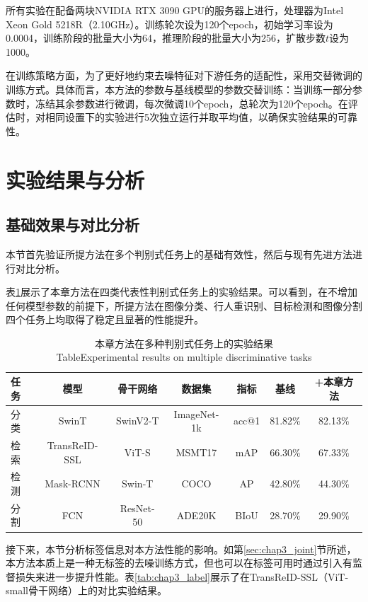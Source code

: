 所有实验在配备两块NVIDIA RTX 3090 GPU的服务器上进行，处理器为Intel Xeon Gold 5218R（2.10GHz）。训练轮次设为120个epoch，初始学习率设为0.0004，训练阶段的批量大小为64，推理阶段的批量大小为256，扩散步数$t$设为1000。

在训练策略方面，为了更好地约束去噪特征对下游任务的适配性，采用交替微调的训练方式。具体而言，本方法的参数与基线模型的参数交替训练：当训练一部分参数时，冻结其余参数进行微调，每次微调10个epoch，总轮次为120个epoch。在评估时，对相同设置下的实验进行5次独立运行并取平均值，以确保实验结果的可靠性。

\section{实验结果与分析}
\label{sec:chap3_exp_result}

\subsection{基础效果与对比分析}

本节首先验证所提方法在多个判别式任务上的基础有效性，然后与现有先进方法进行对比分析。

表\ref{tab:chap3_multi_task}展示了本章方法在四类代表性判别式任务上的实验结果。可以看到，在不增加任何模型参数的前提下，所提方法在图像分类、行人重识别、目标检测和图像分割四个任务上均取得了稳定且显著的性能提升。

\begin{table}[htbp]
\centering
\caption{本章方法在多种判别式任务上的实验结果\protect\\[-2pt]{\rm Table\;\thetable\quad Experimental results on multiple discriminative tasks}}\label{tab:chap3_multi_task}
\vspace{0.2cm}
\renewcommand{\arraystretch}{1.2}
\begin{tabular}{lcccccc}
\hline \hline
任务 & 模型 & 骨干网络 & 数据集 & 指标 & 基线 & +本章方法 \\
\hline
分类 & SwinT & SwinV2-T & ImageNet-1k & acc@1 & 81.82\% & 82.13\% \\
检索 & TransReID-SSL & ViT-S & MSMT17 & mAP & 66.30\% & 67.33\% \\
检测 & Mask-RCNN & Swin-T & COCO & AP & 42.80\% & 44.30\% \\
分割 & FCN & ResNet-50 & ADE20K & BIoU & 28.70\% & 29.90\% \\
\hline\hline
\end{tabular}
\end{table}

接下来，本节分析标签信息对本方法性能的影响。如第\ref{sec:chap3_joint}节所述，本方法本质上是一种无标签的去噪训练方式，但也可以在标签可用时通过引入有监督损失来进一步提升性能。表\ref{tab:chap3_label}展示了在TransReID-SSL（ViT-small骨干网络）上的对比实验结果。

